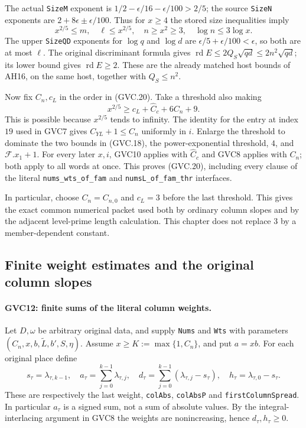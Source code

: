 The actual \texttt{SizeM} exponent is
$1/2-\epsilon/16-\epsilon/100>2/5$; the source
\texttt{SizeN} exponents are $2+8\epsilon\pm\epsilon/100$.
Thus for $x\ge4$ the stored size inequalities imply
\[
 x^{2/5}\le m,\quad
 \ell\le x^{2/5},\quad n\ge x^2\ge3,\quad
 \log n\le3\log x.                                         \tag{GVC.21}
\]
The upper \texttt{SizeQD} exponents for $\log q$ and $\log d$
are $\epsilon/5+\epsilon/100<\epsilon$, so both are at most
$\ell$. The original discriminant formula gives
$\operatorname{rd}E\le2Q_S\sqrt{qd}\le2n^2\sqrt{qd}$;
its lower bound gives $\operatorname{rd}E\ge2$.
These are the already matched host bounds of AH16, on the same
host, together with $Q_S\le n^2$.

Now fix $C_n,c_L$ in the order in (GVC.20).
Take a threshold also making
\[
       x^{2/5}\ge c_L+\widehat C_c+6C_n+9.
\]
This is possible because $x^{2/5}$ tends to infinity.
The identity for the entry at index $19$ used in GVC7 gives
$C_{YL}+1\le C_n$ uniformly in $i$.
Enlarge the threshold to dominate the two bounds in (GVC.18),
the power-exponential threshold, $4$, and $\mathcal F.x_1+1$.
For every later $x,i$, GVC10 applies with $\widehat C_c$ and
GVC8 applies with $C_n$; both apply to all words at once.
This proves (GVC.20), including every clause of the literal
\texttt{nums\_wts\_of\_fam} and
\texttt{numsL\_of\_fam\_thr} interfaces.

In particular, choose $C_n=C_{n,0}$ and $c_L=3$ before the
last threshold. This gives the exact common numerical packet
used both by ordinary column slopes and by the adjacent level-prime
length calculation. This chapter does not replace $3$ by a
member-dependent constant.

\subsection{Finite weight estimates and the original column slopes}

\paragraph{GVC12: finite sums of the literal column weights.}
\label{claim:GVC12}
Let $D,\omega$ be arbitrary original data, and supply
\texttt{Nums} and \texttt{Wts} with parameters
$(C_n,x,b,\widetilde L,b',S,\eta)$.
Assume $x\ge K:=\max\{1,C_n\}$, and put $a=xb$.
For each original place define
\[
 s_\tau=\lambda_{\tau,k-1},\quad
 a_\tau=\sum_{j=0}^{k-1}\lambda_{\tau,j},\quad
 d_\tau=\sum_{j=0}^{k-1}(\lambda_{\tau,j}-s_\tau),\quad
 h_\tau=\lambda_{\tau,0}-s_\tau .
\]
These are respectively the last weight, \texttt{colAbs},
\texttt{colAbsP} and \texttt{firstColumnSpread}.
In particular $a_\tau$ is a signed sum, not a sum of absolute
values. By the integral-interlacing argument in GVC8 the weights
are nonincreasing, hence $d_\tau,h_\tau\ge0$.

